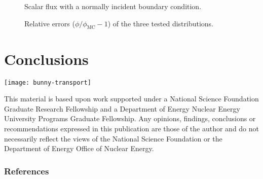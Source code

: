\documentclass{beamer}
\begin{document}
\begin{frame}
\begin{figure}[tb]
  \centering
  \hspace{-.5in}
  
  \hspace{-.5in}
  \caption{Scalar flux with a normally incident boundary condition.}
  \label{fig:delta}
\end{figure}
\end{frame}

\begin{frame}
\begin{figure}[tb]
  \centering
  \hspace{-.5in}
  
  \hspace{-.5in}
  \caption{Relative errors ($\phi/\phi_\text{MC} - 1$) of the three tested
  distributions.}
  \label{fig:relative}
\end{figure}
\end{frame}
\section{Conclusions}
\appendix
\begin{frame}

{\par\centering%
  \texttt{[image: bunny-transport]}

}
{\setlength{\baselineskip}{-\baselineskip} \tiny 
This material is based upon work supported under a National Science Foundation
Graduate Research Fellowship and a Department of Energy Nuclear Energy
University Programs Graduate Fellowship. Any opinions, findings, conclusions or
recommendations expressed in this publication are those of the author and do
not necessarily reflect the views of the National Science Foundation or the
Department of Energy Office of Nuclear Energy.\par}
\end{frame}

\begin{frame}
  \frametitle{References}


\end{frame}
\end{document}
